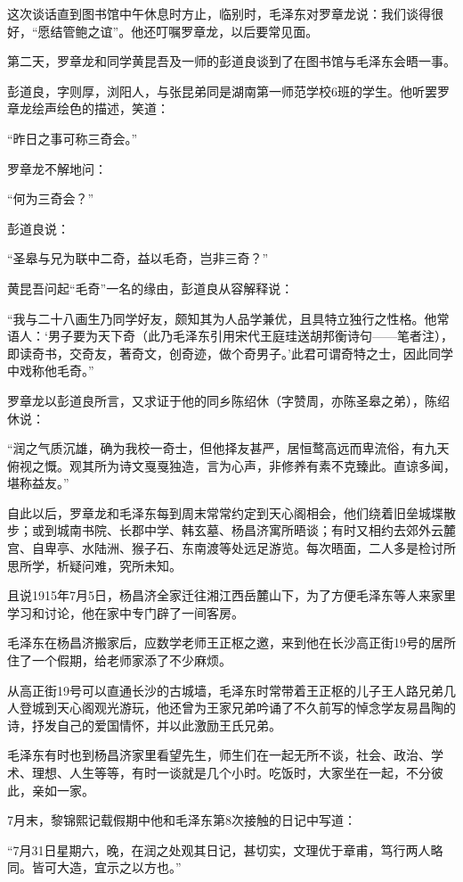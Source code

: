 \documentclass[../../dazhuan.tex]{subfiles}
\begin{document}
这次谈话直到图书馆中午休息时方止，临别时，毛泽东对罗章龙说：我们谈得很好，“愿结管鲍之谊”。他还叮嘱罗章龙，以后要常见面。

第二天，罗章龙和同学黄昆吾及一师的彭道良谈到了在图书馆与毛泽东会晤一事。

彭道良，字则厚，浏阳人，与张昆弟同是湖南第一师范学校6班的学生。他听罢罗章龙绘声绘色的描述，笑道：

“昨日之事可称三奇会。”

罗章龙不解地问：

“何为三奇会？”

彭道良说：

“圣皋与兄为联中二奇，益以毛奇，岂非三奇？”

黄昆吾问起“毛奇”一名的缘由，彭道良从容解释说：

“我与二十八画生乃同学好友，颇知其为人品学兼优，且具特立独行之性格。他常语人：‘男子要为天下奇（此乃毛泽东引用宋代王庭珪送胡邦衡诗句——笔者注），即读奇书，交奇友，著奇文，创奇迹，做个奇男子。’此君可谓奇特之士，因此同学中戏称他毛奇。”

罗章龙以彭道良所言，又求证于他的同乡陈绍休（字赞周，亦陈圣皋之弟），陈绍休说：

“润之气质沉雄，确为我校一奇士，但他择友甚严，居恒鹜高远而卑流俗，有九天俯视之慨。观其所为诗文戛戛独造，言为心声，非修养有素不克臻此。直谅多闻，堪称益友。”

自此以后，罗章龙和毛泽东每到周末常常约定到天心阁相会，他们绕着旧垒城堞散步；或到城南书院、长郡中学、韩玄墓、杨昌济寓所晤谈；有时又相约去郊外云麓宫、自卑亭、水陆洲、猴子石、东南渡等处远足游览。每次晤面，二人多是检讨所思所学，析疑问难，究所未知。

且说1915年7月5日，杨昌济全家迁往湘江西岳麓山下，为了方便毛泽东等人来家里学习和讨论，他在家中专门辟了一间客房。

毛泽东在杨昌济搬家后，应数学老师王正枢之邀，来到他在长沙高正街19号的居所住了一个假期，给老师家添了不少麻烦。

从高正街19号可以直通长沙的古城墙，毛泽东时常带着王正枢的儿子王人路兄弟几人登城到天心阁观光游玩，他还曾为王家兄弟吟诵了不久前写的悼念学友易昌陶的诗，抒发自己的爱国情怀，并以此激励王氏兄弟。

毛泽东有时也到杨昌济家里看望先生，师生们在一起无所不谈，社会、政治、学术、理想、人生等等，有时一谈就是几个小时。吃饭时，大家坐在一起，不分彼此，亲如一家。

7月末，黎锦熙记载假期中他和毛泽东第8次接触的日记中写道：

“7月31日星期六，晚，在润之处观其日记，甚切实，文理优于章甫，笃行两人略同。皆可大造，宜示之以方也。”
\end{document}
